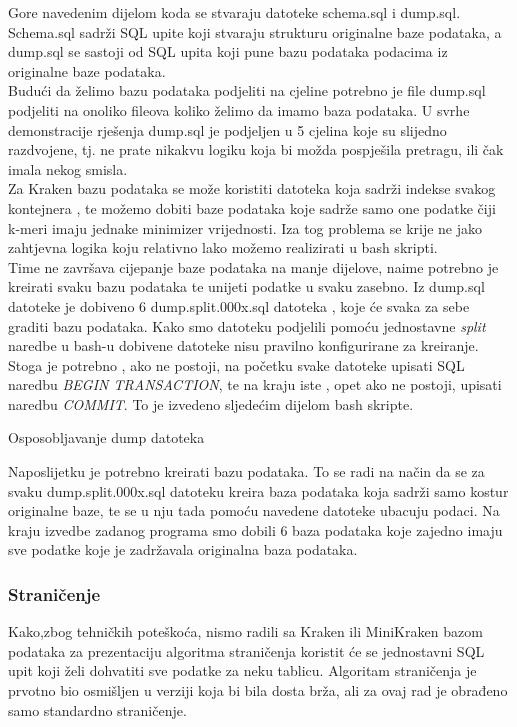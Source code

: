 \documentclass[times, utf8, zavrsni]{fer}
\begin{document}
{Gore navedenim dijelom koda se stvaraju datoteke schema.sql i dump.sql. Schema.sql sadrži SQL upite koji stvaraju strukturu originalne baze podataka, a dump.sql se sastoji od SQL upita koji pune bazu podataka podacima iz originalne baze podataka.
\\Budući da želimo bazu podataka podjeliti na cjeline potrebno je file dump.sql podjeliti na onoliko fileova koliko želimo da imamo baza podataka. U svrhe demonstracije rješenja dump.sql je podjeljen u 5 cjelina koje su slijedno razdvojene, tj. ne prate nikakvu logiku koja bi možda pospješila pretragu, ili čak imala nekog smisla. \\Za Kraken bazu podataka se može koristiti datoteka koja sadrži indekse svakog kontejnera , te možemo dobiti baze podataka koje sadrže samo one podatke čiji k-meri imaju jednake minimizer vrijednosti. Iza tog problema se krije ne jako zahtjevna logika koju relativno lako možemo realizirati u bash skripti.
\\Time ne završava cijepanje baze podataka na manje dijelove, naime potrebno je kreirati svaku bazu podataka te unijeti podatke u svaku zasebno. Iz dump.sql datoteke je dobiveno 6 dump.split.000x.sql datoteka , koje će svaka za sebe graditi bazu podataka. Kako smo datoteku podjelili pomoću jednostavne \textit{split} naredbe u bash-u dobivene datoteke nisu pravilno konfigurirane za kreiranje. Stoga je potrebno , ako ne postoji, na početku svake datoteke upisati SQL naredbu  \textit{BEGIN TRANSACTION}, te na kraju iste , opet ako ne postoji, upisati naredbu \textit{COMMIT}. To je izvedeno sljedećim dijelom bash skripte.

\begin{algorithm}[H]
	\caption{Osposobljavanje dump datoteka}
	\label{PodjelaBp}
\end{algorithm}

Naposlijetku je potrebno kreirati bazu podataka. To se radi na način da se za svaku dump.split.000x.sql datoteku kreira baza podataka koja sadrži samo kostur originalne baze, te se u nju tada pomoću navedene datoteke ubacuju podaci. Na kraju izvedbe zadanog programa smo dobili 6 baza podataka koje zajedno imaju sve podatke koje je zadržavala originalna baza podataka.

\subsubsection{Straničenje}
Kako,zbog tehničkih poteškoća, nismo radili sa Kraken ili MiniKraken bazom podataka za prezentaciju algoritma straničenja koristit će se jednostavni SQL upit koji želi dohvatiti sve podatke za neku tablicu. Algoritam straničenja je prvotno bio osmišljen u verziji koja bi bila dosta brža, ali za ovaj rad je obrađeno samo standardno straničenje.

}
\end{document}
